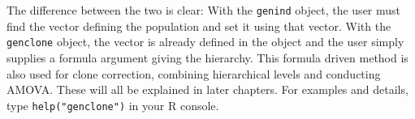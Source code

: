 \documentclass[letterpaper]{article}\usepackage[]{graphicx}\usepackage[]{color}
\newcommand{\tab}{\hspace*{1em}}
\begin{document}
The difference between the two is clear: With the \texttt{genind} object, the
user must find the vector defining the population and set it using that vector.
With the \texttt{genclone} object, the vector is already defined in the object
and the user simply supplies a formula argument giving the hierarchy. This 
formula driven method is also used for clone correction, combining hierarchical
levels and conducting AMOVA. These will all be explained in later chapters. For
examples and details, type \texttt{help("genclone")} in your R console.

% 
% 
\end{document}
